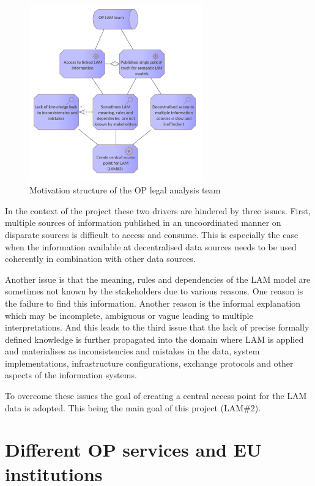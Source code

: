 	\begin{figure}[!h]
	\centering
	\includegraphics[width=0.67\textwidth]{images/motivation/LAM team motivation.png}
	\caption{Motivation structure of the OP legal analysis team}
	\label{fig:motivation-lam-team}
	\end{figure}

	In the context of the project these two drivers are hindered by three issues. First, multiple sources of information published in an uncoordinated manner on disparate sources is difficult to access and consume. This is especially the case when the information available at decentralised data sources needs to be used coherently in combination with other data sources. 
	
	Another issue is that the meaning, rules and dependencies of the LAM model are sometimes not known by the stakeholders due to various reasons. One reason is the failure to find this information. Another reason is the informal explanation which may be incomplete, ambiguous or vague leading to multiple interpretations. And this leads to the third issue that the lack of precise formally defined knowledge is further propagated into the domain where LAM is applied and materialises as inconsistencies and mistakes in the data, system implementations, infrastructure configurations, exchange protocols and other aspects of the information systems. 
	
	To overcome these issues the goal of creating a central access point for the LAM data is adopted. This being the main goal of this project (LAM\#2). 	

	\section{Different OP services and EU institutions}
	
